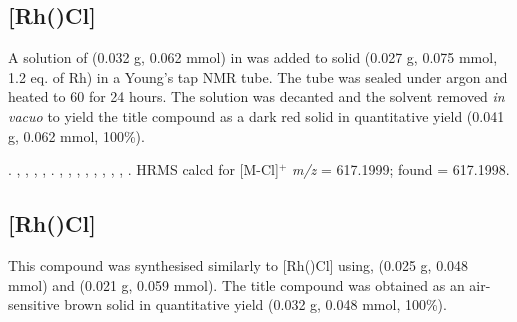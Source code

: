 
\subsection*{[Rh(\tBusixantphosk)Cl]}


A solution of \tBusixantphos{} (0.032 g, 0.062 mmol) in  was added to solid  (0.027 g, 0.075 mmol, 1.2 eq. of Rh) in a Young's tap NMR tube.  The tube was sealed under argon and heated to 60 \degC{} for 24 hours.  The solution was decanted and the solvent removed \emph{in vacuo} to yield the title compound as a dark red solid in quantitative yield (0.041 g, 0.062 mmol, 100\%).

.
,
,
,
,
.
,
,
,
,
,
,
,
,
.
HRMS calcd for  [M-Cl]$^+$ \emph{m/z} = 617.1999; found = 617.1998.



\subsection*{[Rh(\tButhixantphosk)Cl]}


This compound was synthesised similarly to [Rh(\tBusixantphos)Cl] using, \tButhixantphos{} (0.025 g, 0.048 mmol) and  (0.021 g, 0.059 mmol).  The title compound was obtained as an air-sensitive brown solid in quantitative yield (0.032 g, 0.048 mmol, 100\%).  

